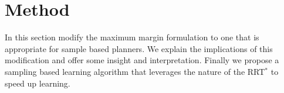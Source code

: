 \documentclass{article}  %
\begin{document}
\section{Method}
	In this section modify the maximum margin formulation to one that is appropriate for sample based planners. We explain the implications of this modification and offer some insight and interpretation. Finally we propose a sampling based learning algorithm that leverages the nature of the RRT$^*$ to speed up learning.

\end{document}
